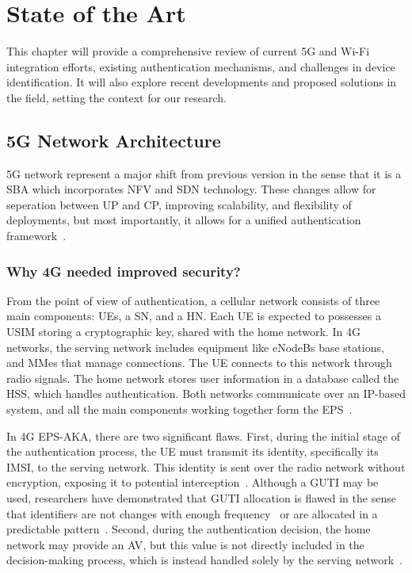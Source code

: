 \chapter{State of the Art}%
\label{chapter:State of the Art}

\begin{introduction}
This chapter will provide a comprehensive review of current \ac{5G} and Wi-Fi integration efforts, existing authentication mechanisms, and challenges in device identification. It will also explore recent developments and proposed solutions in the field, setting the context for our research.
\end{introduction}

\section{\acs{5G} Network Architecture}

\ac{5G} network represent a major shift from previous version in the sense that it is a \ac{SBA} which incorporates \ac{NFV} and \ac{SDN} technology. These changes allow for seperation between \ac{UP} and \ac{CP}, improving scalability, and flexibility of deployments, but most importantly, it allows for a unified authentication framework~\cite{23.501-p56}.

\subsection{Why \acs{4G} needed improved security?}

From the point of view of authentication, a cellular network consists of three main components: \acp{UE}, a \ac{SN}, and a \ac{HN}. Each \ac{UE} is expected to possesses a \ac{USIM} storing a cryptographic key, shared with the home network. In 4G networks, the serving network includes equipment like \acp{eNodeB} base stations, and  \acp{MMe} that manage connections. The \ac{UE} connects to this network through radio signals. The home network stores user information in a database called the \ac{HSS}, which handles authentication. Both networks communicate over an \ac{IP}-based system, and all the main components working together form the \ac{EPS}~\cite{cbl-comp-4g-5g-p3}.

In \ac{4G} \ac{EPS-AKA}, there are two significant flaws. First, during the initial stage of the authentication process, the \ac{UE} must transmit its identity, specifically its \ac{IMSI}, to the serving network. This identity is sent over the radio network without encryption, exposing it to potential interception~\cite{cbl-comp-4g-5g-p3}. Although a \ac{GUTI} may be used, researchers have demonstrated that \ac{GUTI} allocation is flawed in the sense that identifiers are not changes with enough frequency~\cite{gt-freq} or are allocated in a predictable pattern~\cite{gt-pred}. Second, during the authentication decision, the home network may provide an \ac{AV}, but this value is not directly included in the decision-making process, which is instead handled solely by the serving network~\cite{cbl-comp-4g-5g-p4}.

